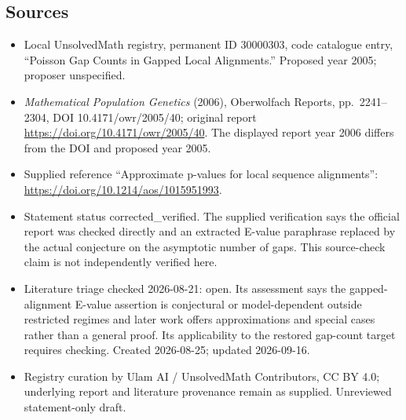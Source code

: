 \documentclass[11pt]{article}
\begin{document}
\subsection{Sources}
\begin{itemize}
\item Local UnsolvedMath registry, permanent ID 30000303, code catalogue entry, ``Poisson Gap Counts in Gapped Local Alignments.'' Proposed year 2005; proposer unspecified.
\item \emph{Mathematical Population Genetics} (2006), Oberwolfach Reports, pp.\ 2241--2304, DOI 10.4171/owr/2005/40; original report \url{https://doi.org/10.4171/owr/2005/40}. The displayed report year 2006 differs from the DOI and proposed year 2005.
\item Supplied reference ``Approximate p-values for local sequence alignments'': \url{https://doi.org/10.1214/aos/1015951993}.
\item Statement status corrected\_verified. The supplied verification says the official report was checked directly and an extracted E-value paraphrase replaced by the actual conjecture on the asymptotic number of gaps. This source-check claim is not independently verified here.
\item Literature triage checked 2026-08-21: open. Its assessment says the gapped-alignment E-value assertion is conjectural or model-dependent outside restricted regimes and later work offers approximations and special cases rather than a general proof. Its applicability to the restored gap-count target requires checking. Created 2026-08-25; updated 2026-09-16.
\item Registry curation by Ulam AI / UnsolvedMath Contributors, CC BY 4.0; underlying report and literature provenance remain as supplied. Unreviewed statement-only draft.
\end{itemize}
\end{document}
